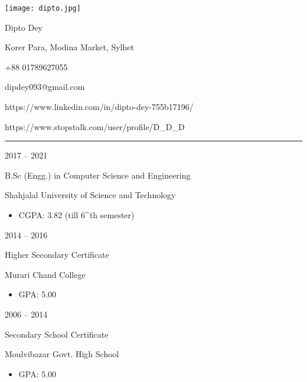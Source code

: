 \documentclass[a4paper,10pt]{article}
\newlength{\cvcolumngapwidth}
\newlength{\cvleftcolumnwidth}
\newlength{\cvrightcolumnwidth}
\newcommand{\cvnamestyle}[1]{{\Large\cvnamefont\textcolor{cvnamecolor}{#1}}}
\newcommand{\cvsectionstyle}[1]{{\normalsize\cvsectionfont\textcolor{cvsectioncolor}{#1}}}
\newcommand{\cvtitlestyle}[1]{{\large\cvtitlefont\textcolor{cvtitlecolor}{#1}}}
\newcommand{\cvdurationstyle}[1]{{\small\cvdurationfont\textcolor{cvdurationcolor}{#1}}}
\newlength{\cvafteritemskipamount}
\newlength{\cvaftersectionskipamount}
\newlength{\cvafternameskipamount}
\newlength{\cvafterpersonalinfolineskipamount}
\newlength{\cvaftertitleskipamount}
\newlength{\cvparskip}
\newcommand{\cvpersonalinfo}[2]{
    \begin{minipage}[t]{\cvleftcolumnwidth}
        \vspace{0mm} %
        \raggedleft #1
    \end{minipage}%
    \hspace{\cvcolumngapwidth}%
    \begin{minipage}[t]{\cvrightcolumnwidth}
        \vspace{0mm} %
        #2
    \end{minipage}

    \vspace{\cvafteritemskipamount}
}
\newcommand{\cvname}[1]{
    \cvnamestyle{#1}

    \vspace{\cvafternameskipamount}
}
\newcommand{\cvpersonalinfolinewithicon}[3]{
    \raisebox{.5\fontcharht\font`E-.5\height}{\texttt{[image: \#2]}}
    #3

    \vspace{\cvafterpersonalinfolineskipamount}
}
\newcommand{\cvsection}[1]{
    \begin{minipage}[t]{\cvleftcolumnwidth}
        \raggedleft\cvsectionstyle{#1}
    \end{minipage}%
    \hspace{\cvcolumngapwidth}%
    \begin{minipage}[t]{\cvrightcolumnwidth}
        \textcolor{cvrulecolor}{\rule{\cvrightcolumnwidth}{0.3mm}}
    \end{minipage}

    \vspace{\cvaftersectionskipamount}
}
\newcommand{\cvitem}[2]{
    \begin{minipage}[t]{\cvleftcolumnwidth}
        \raggedleft #1
    \end{minipage}%
    \hspace{\cvcolumngapwidth}%
    \begin{minipage}[t]{\cvrightcolumnwidth}
        \setlength{\parskip}{\cvparskip} #2
    \end{minipage}

    \vspace{\cvafteritemskipamount}
}
\newcommand{\cvtitle}[1]{
    \cvtitlestyle{#1}

    \vspace{\cvaftertitleskipamount}
    \vspace{-\cvparskip}
}
\begin{document}

\cvpersonalinfo{
    \texttt{[image: dipto.jpg]}
}{
    \cvname{Dipto Dey}

    \cvpersonalinfolinewithicon{height=4mm}{072-location.pdf}{
        {Korer Para, Modina Market, Sylhet}
    }

    \cvpersonalinfolinewithicon{height=4mm}{067-phone.pdf}{
        +88 01789627055
    }

    \cvpersonalinfolinewithicon{height=4mm}{070-envelop.pdf}{
        dipdey093@gmail.com
    }

    \cvpersonalinfolinewithicon{height=4mm}{458-linkedin.pdf}{
        https://www.linkedin.com/in/dipto-dey-755b17196/
    }
    \cvpersonalinfolinewithicon{height=4mm}{StopStalklogo.png}{
       https://www.stopstalk.com/user/profile/D\_D\_D
    }

}



\cvsection{EDUCATION}

\cvitem{
    \cvdurationstyle{2017 -- 2021}
}{
    \cvtitle{ B.Sc (Engg.) in Computer Science and Engineering}

    Shahjalal University of Science and Technology

    \begin{itemize}[leftmargin=*]
        \item CGPA: 3.82 (till 6^{th} semester)
    \end{itemize}
}

\cvitem{
    \cvdurationstyle{2014 -- 2016}
}{
    \cvtitle{Higher Secondary Certificate}

    Murari Chand College

    \begin{itemize}[leftmargin=*]
        \item GPA: 5.00
    \end{itemize}
}
\cvitem{
    \cvdurationstyle{2006 -- 2014}
}{
    \cvtitle{Secondary School Certificate}

    Moulvibazar Govt. High School

    \begin{itemize}[leftmargin=*]
        \item GPA: 5.00
    \end{itemize}
}
\end{document}
